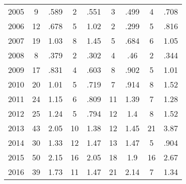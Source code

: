 \begin{table}[htbp]
\begin{tabular}{l*{8}{c}}
2005      &        9&     .589&        2&     .551&        3&     .499&        4&     .708\\
2006      &       12&     .678&        5&     1.02&        2&     .299&        5&     .816\\
2007      &       19&     1.03&        8&     1.45&        5&     .684&        6&     1.05\\
2008      &        8&     .379&        2&     .302&        4&      .46&        2&     .344\\
2009      &       17&     .831&        4&     .603&        8&     .902&        5&     1.01\\
2010      &       20&     1.01&        5&     .719&        7&     .914&        8&     1.52\\
2011      &       24&     1.15&        6&     .809&       11&     1.39&        7&     1.28\\
2012      &       25&     1.24&        5&     .794&       12&      1.4&        8&     1.52\\
2013      &       43&     2.05&       10&     1.38&       12&     1.45&       21&     3.87\\
2014      &       30&     1.33&       12&     1.47&       13&     1.47&        5&     .904\\
2015      &       50&     2.15&       16&     2.05&       18&      1.9&       16&     2.67\\
2016      &       39&     1.73&       11&     1.47&       21&     2.14&        7&     1.34\\
\hline\hline
\end{tabular}
\end{table}
